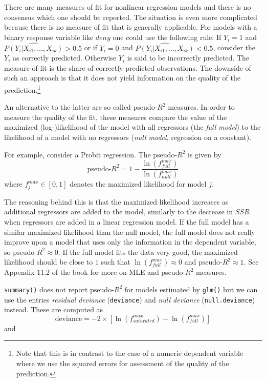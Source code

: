 \documentclass[]{book}
\let\rmarkdownfootnote\footnote%
\def\footnote{\protect\rmarkdownfootnote}
\theoremstyle{definition}
\theoremstyle{definition}
\theoremstyle{definition}
\theoremstyle{remark}
\begin{document}
There are many measures of fit for nonlinear regression models and there
is no consensus which one should be reported. The situation is even more
complicated because there is no measure of fit that is generally
applicable. For models with a binary response variable like \(deny\) one
could use the following rule: \newline If \(Y_i = 1\) and
\(\widehat{P(Y_i|X_{i1}, \dots, X_{ik})} > 0.5\) or if \(Y_i = 0\) and
\(\widehat{P(Y_i|X_{i1}, \dots, X_{ik})} < 0.5\), consider the \(Y_i\)
as correctly predicted. Otherwise \(Y_i\) is said to be incorrectly
predicted. The measure of fit is the share of correctly predicted
observations. The downside of such an approach is that it does not yield
information on the quality of the prediction.\footnote{Note that this is
  in contrast to the case of a numeric dependent variable where we use
  the squared errors for assessment of the quality of the prediction.}

An alternative to the latter are so called pseudo-\(R^2\) measures. In
order to measure the quality of the fit, these measures compare the
value of the maximized (log-)likelihood of the model with all regressors
(the \emph{full model}) to the likelihood of a model with no regressors
(\emph{null model}, regression on a constant).

For example, consider a Probit regression. The \(\text{pseudo-}R^2\) is
given by
\[\text{pseudo-}R^2 = 1 - \frac{\ln(f^{max}_{full})}{\ln(f^{max}_{null})}\]
where \(f^{max}_j \in [0,1]\) denotes the maximized likelihood for model
\(j\).

The reasoning behind this is that the maximized likelihood increases as
additional regressors are added to the model, similarly to the decrease
in \(SSR\) when regressors are added in a linear regression model. If
the full model has a similar maximized likelihood than the null model,
the full model does not really improve upon a model that uses only the
information in the dependent variable, so
\(\text{pseudo-}R^2 \approx 0\). If the full model fits the data very
good, the maximized likelihood should be close to \(1\) such that
\(\ln(f^{max}_{full}) \approx 0\) and \(\text{pseudo-}R^2 \approx 1\).
See Appendix 11.2 of the book for more on MLE and pseudo-\(R^2\)
measures.

\texttt{summary()} does not report \(\text{pseudo-}R^2\) for models
estimated by \texttt{glm()} but we can use the entries \emph{residual
deviance} (\texttt{deviance}) and \emph{null deviance}
(\texttt{null.deviance}) instead. These are computed as
\[\text{deviance} = -2 \times \left[\ln(f^{max}_{saturated}) - \ln(f^{max}_{full}) \right]\]
and
\end{document}

